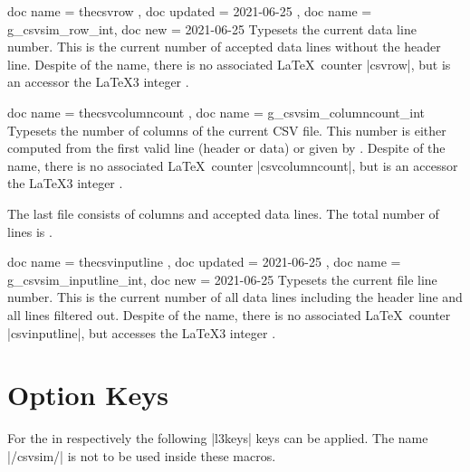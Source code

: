 \documentclass[a4paper,11pt]{ltxdoc}
\begin{document}
\begin{docCommands}{
    { doc name = thecsvrow       , doc updated = 2021-06-25 },
    { doc name = g_csvsim_row_int, doc new     = 2021-06-25 }
  }
  Typesets the current data line number. This is the
  current number of accepted data lines without the header line.
  Despite of the name, there is no associated \LaTeX\ counter |csvrow|,
  but  is an accessor the \LaTeX3 integer
  .
\end{docCommands}


\begin{docCommands}[doc new=2021-06-25]{
    { doc name = thecsvcolumncount },
    { doc name = g_csvsim_columncount_int }
  }
  Typesets the number of columns of the current CSV file. This number
  is either computed from the first valid line (header or data) or
  given by .
  Despite of the name, there is no associated \LaTeX\ counter |csvcolumncount|,
  but  is an accessor the \LaTeX3 integer
  .
\begin{dispExample}
%
The last file consists of \thecsvcolumncount{} columns and
\thecsvrow{} accepted data lines. The total number of lines
is \thecsvinputline{}.
\end{dispExample}
\end{docCommands}


\begin{docCommands}{
    { doc name = thecsvinputline       , doc updated = 2021-06-25 },
    { doc name = g_csvsim_inputline_int, doc new     = 2021-06-25 }
  }
  Typesets the current file line number. This is the
  current number of all data lines including the header line and all
  lines filtered out.
  Despite of the name, there is no associated \LaTeX\ counter |csvinputline|,
  but  accesses the \LaTeX3 integer
  .
\begin{dispExample}
\end{dispExample}
\end{docCommands}





\clearpage
\section{Option Keys}\label{sec:schluessel}%
For the  in  respectively 
the following |l3keys| keys can be applied. The  name |/csvsim/| is not
to be used inside these macros.
\end{document}
